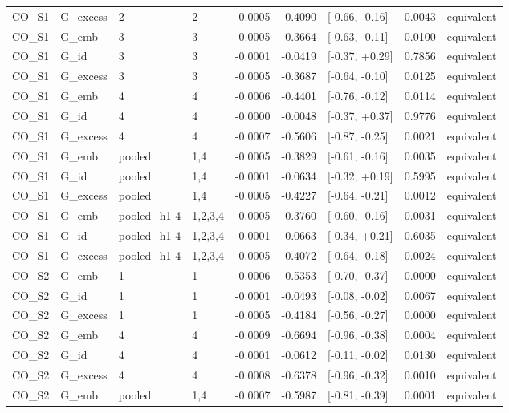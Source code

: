 \begin{tabular}{llllrrlrl}
CO\_S1 & G\_excess & 2 & 2 & -0.0005 & -0.4090 & [-0.66, -0.16] & 0.0043 & equivalent \\
CO\_S1 & G\_emb & 3 & 3 & -0.0005 & -0.3664 & [-0.63, -0.11] & 0.0100 & equivalent \\
CO\_S1 & G\_id & 3 & 3 & -0.0001 & -0.0419 & [-0.37, +0.29] & 0.7856 & equivalent \\
CO\_S1 & G\_excess & 3 & 3 & -0.0005 & -0.3687 & [-0.64, -0.10] & 0.0125 & equivalent \\
CO\_S1 & G\_emb & 4 & 4 & -0.0006 & -0.4401 & [-0.76, -0.12] & 0.0114 & equivalent \\
CO\_S1 & G\_id & 4 & 4 & -0.0000 & -0.0048 & [-0.37, +0.37] & 0.9776 & equivalent \\
CO\_S1 & G\_excess & 4 & 4 & -0.0007 & -0.5606 & [-0.87, -0.25] & 0.0021 & equivalent \\
CO\_S1 & G\_emb & pooled & 1,4 & -0.0005 & -0.3829 & [-0.61, -0.16] & 0.0035 & equivalent \\
CO\_S1 & G\_id & pooled & 1,4 & -0.0001 & -0.0634 & [-0.32, +0.19] & 0.5995 & equivalent \\
CO\_S1 & G\_excess & pooled & 1,4 & -0.0005 & -0.4227 & [-0.64, -0.21] & 0.0012 & equivalent \\
CO\_S1 & G\_emb & pooled\_h1-4 & 1,2,3,4 & -0.0005 & -0.3760 & [-0.60, -0.16] & 0.0031 & equivalent \\
CO\_S1 & G\_id & pooled\_h1-4 & 1,2,3,4 & -0.0001 & -0.0663 & [-0.34, +0.21] & 0.6035 & equivalent \\
CO\_S1 & G\_excess & pooled\_h1-4 & 1,2,3,4 & -0.0005 & -0.4072 & [-0.64, -0.18] & 0.0024 & equivalent \\
CO\_S2 & G\_emb & 1 & 1 & -0.0006 & -0.5353 & [-0.70, -0.37] & 0.0000 & equivalent \\
CO\_S2 & G\_id & 1 & 1 & -0.0001 & -0.0493 & [-0.08, -0.02] & 0.0067 & equivalent \\
CO\_S2 & G\_excess & 1 & 1 & -0.0005 & -0.4184 & [-0.56, -0.27] & 0.0000 & equivalent \\
CO\_S2 & G\_emb & 4 & 4 & -0.0009 & -0.6694 & [-0.96, -0.38] & 0.0004 & equivalent \\
CO\_S2 & G\_id & 4 & 4 & -0.0001 & -0.0612 & [-0.11, -0.02] & 0.0130 & equivalent \\
CO\_S2 & G\_excess & 4 & 4 & -0.0008 & -0.6378 & [-0.96, -0.32] & 0.0010 & equivalent \\
CO\_S2 & G\_emb & pooled & 1,4 & -0.0007 & -0.5987 & [-0.81, -0.39] & 0.0001 & equivalent \\

\end{tabular}

